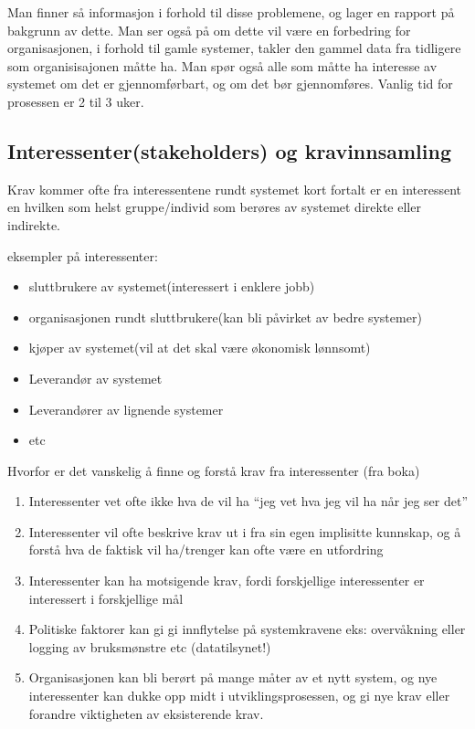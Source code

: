 \documentclass[11pt]{article}
\begin{document}
   Man finner så informasjon i forhold til disse problemene, og lager en rapport på bakgrunn av dette.
   Man ser også på om dette vil være en forbedring for organisasjonen, i forhold til gamle systemer, 
   takler den gammel data fra tidligere som organisisajonen måtte ha.
   Man spør også alle som måtte ha interesse av systemet om det er
   gjennomførbart, og om det bør gjennomføres. 
   Vanlig tid for  prosessen er 2 til 3 uker.
\subsection{Interessenter(stakeholders) og kravinnsamling}
\label{sec-6.2}


   Krav kommer ofte fra interessentene rundt systemet
   kort fortalt er en interessent en hvilken som helst 
   gruppe/individ som berøres av systemet direkte eller 
   indirekte.
   
   eksempler på interessenter:
\begin{itemize}
\item sluttbrukere av systemet(interessert i enklere jobb)
\item organisasjonen rundt sluttbrukere(kan bli påvirket av bedre systemer)
\item kjøper av systemet(vil at det skal være økonomisk lønnsomt)
\item Leverandør av systemet
\item Leverandører av lignende systemer
\item etc
\end{itemize}

   Hvorfor er det vanskelig å finne og forstå krav fra interessenter (fra boka)
\begin{enumerate}
\item Interessenter vet ofte ikke hva de vil ha ``jeg vet hva jeg vil ha når jeg ser det''
\item Interessenter vil ofte beskrive krav ut i fra sin egen implisitte kunnskap, og å
      forstå hva de faktisk vil ha/trenger kan ofte være en utfordring
\item Interessenter kan ha motsigende krav, fordi forskjellige interessenter
      er interessert i forskjellige mål
\item Politiske faktorer kan gi gi innflytelse på systemkravene
      eks: overvåkning eller logging av bruksmønstre etc (datatilsynet!)
\item Organisasjonen kan bli berørt på mange måter av et nytt system, og
      nye interessenter kan dukke opp midt i utviklingsprosessen, og gi nye krav
      eller forandre viktigheten av eksisterende krav.
\end{enumerate}
      
\end{document}
